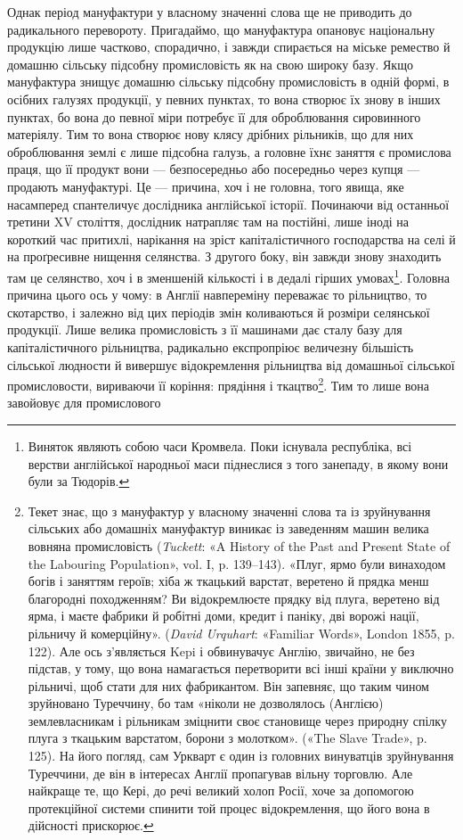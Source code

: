 Однак період мануфактури у власному значенні слова ще не
приводить до радикального перевороту. Пригадаймо, що мануфактура
опановує національну продукцію лише частково, спорадично,
і завжди спирається на міське ремество й домашню
сільську підсобну промисловість як на свою широку базу.
Якщо мануфактура знищує домашню сільську підсобну промисловість
в одній формі, в осібних галузях продукції, у певних
пунктах, то вона створює їх знову в інших пунктах, бо вона до
певної міри потребує її для оброблювання сировинного матеріялу.
Тим то вона створює нову клясу дрібних рільників, що для них
оброблювання землі є лише підсобна галузь, а головне їхнє заняття
є промислова праця, що її продукт вони — безпосередньо
або посередньо через купця — продають мануфактурі. Це —
причина, хоч і не головна, того явища, яке насамперед спантеличує
дослідника англійської історії. Починаючи від останньої
третини XV століття, дослідник натрапляє там на постійні,
лише іноді на короткий час притихлі, нарікання на зріст капіталістичного
господарства на селі й на проґресивне нищення
селянства. З другого боку, він завжди знову знаходить там це
селянство, хоч і в зменшеній кількості і в дедалі гірших умовах\footnote{
Виняток являють собою часи Кромвела. Поки існувала республіка,
всі верстви англійської народньої маси піднеслися з того занепаду,
в якому вони були за Тюдорів.
}.
Головна причина цього ось у чому: в Англії навпереміну переважає
то рільництво, то скотарство, і залежно від цих періодів
змін коливаються й розміри селянської продукції. Лише велика
промисловість з її машинами дає сталу базу для капіталістичного
рільництва, радикально експропріює величезну більшість сільської
людности й вивершує відокремлення рільництва від домашньої
сільської промисловости, вириваючи її коріння: прядіння
і ткацтво\footnote{
Текет знає, що з мануфактур у власному значенні слова та із
зруйнування сільських або домашніх мануфактур виникає із заведенням
машин велика вовняна промисловість (\emph{Tuckett}: «A History of the Past
and Present State of the Labouring Population», vol. I, p. 139--143).
«Плуг, ярмо були винаходом богів і заняттям героїв; хіба ж ткацький
варстат, веретено й прядка менш благородні походженням? Ви відокремлюєте
прядку від плуга, веретено від ярма, і маєте фабрики й робітні
доми, кредит і паніку, дві ворожі нації, рільничу й комерційну».
(\emph{David Urquhart}: «Familiar Words», London 1855, p. 122). Але ось з’являється
Kepi і обвинувачує Англію, звичайно, не без підстав, у тому,
що вона намагається перетворити всі інші країни у виключно рільничі,
щоб стати для них фабрикантом. Він запевняє, що таким чином зруйновано
Туреччину, бо там «ніколи не дозволялось (Англією) землевласникам
і рільникам зміцнити своє становище через природну спілку плуга
з ткацьким варстатом, борони з молотком». («The Slave Trade», p. 125).
На його погляд, сам Уркварт є один із головних винуватців зруйнування
Туреччини, де він в інтересах Англії пропагував вільну торговлю.
Але найкраще те, що Кері, до речі великий холоп Росії, хоче за допомогою
протекційної системи спинити той процес відокремлення, що його вона
в дійсності прискорює.
}. Тим то лише вона завойовує для промислового
